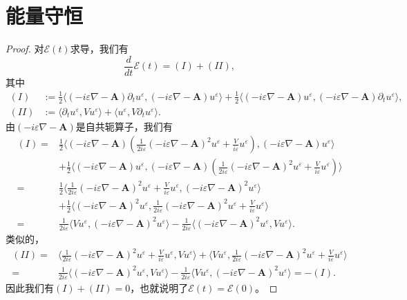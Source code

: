 \section{能量守恒}
\begin{proof}
对$\mathcal E(t)$求导，我们有 
\[
\frac{d}{dt}\mathcal E(t)=(I)+(II),
\]
其中
\begin{align*}
(I)&:=\frac{1}{2}\langle(-i\varepsilon\nabla-\mathbf{A})\partial_t u^{\varepsilon},(-i\varepsilon\nabla-\mathbf{A})u^{\varepsilon}\rangle+\frac{1}{2}\langle (-i\varepsilon\nabla-\mathbf{A})u^{\varepsilon},(-i\varepsilon\nabla-\mathbf{A})\partial_t u^{\varepsilon}\rangle, \\
(II)&:=\langle\partial_t u^{\varepsilon},Vu^{\varepsilon}\rangle+\langle u^{\varepsilon},V\partial_t u^{\varepsilon}\rangle.
\end{align*}
由$(-i\varepsilon\nabla-\mathbf{A})$是自共轭算子，我们有
\begin{align*}
(I)=&\frac{1}{2}\langle(-i\varepsilon\nabla-\mathbf{A})\left(\frac{1}{2i\varepsilon}(-i\varepsilon\nabla-\mathbf{A})^2 u^{\varepsilon}+\frac{V}{i\varepsilon}u^{\varepsilon}\right),(-i\varepsilon\nabla-\mathbf{A})u^{\varepsilon}\rangle\\
&+\frac{1}{2}\langle(-i\varepsilon\nabla-\mathbf{A})u^{\varepsilon},(-i\varepsilon\nabla-\mathbf{A})\left(\frac{1}{2i\varepsilon}(-i\varepsilon\nabla-\mathbf{A})^2 u^{\varepsilon}+\frac{V}{i\varepsilon}u^{\varepsilon}\right)\rangle\\
=&\frac{1}{2}\langle\frac{1}{2i\varepsilon}(-i\varepsilon\nabla-\mathbf{A})^2 u^{\varepsilon}+\frac{V}{i\varepsilon}u^{\varepsilon},(-i\varepsilon\nabla-\mathbf{A})^2u^{\varepsilon}\rangle\\
&+\frac{1}{2}\langle(-i\varepsilon\nabla-\mathbf{A})^2 u^{\varepsilon},\frac{1}{2i\varepsilon}(-i\varepsilon\nabla-\mathbf{A})^2 u^{\varepsilon}+\frac{V}{i\varepsilon}u^{\varepsilon}\rangle\\
=&\frac{1}{2i\varepsilon}\langle Vu^{\varepsilon},(-i\varepsilon\nabla-\mathbf{A})^2 u^{\varepsilon}\rangle-\frac{1}{2i\varepsilon}\langle(-i\varepsilon\nabla-\mathbf{A})^2 u^{\varepsilon},Vu^{\varepsilon}\rangle. 
\end{align*}
类似的，
\begin{align*}
(II)=&\langle \frac{1}{2i\varepsilon}(-i\varepsilon\nabla-\mathbf{A})^2 u^{\varepsilon}+\frac{V}{i\varepsilon}u^{\varepsilon},Vu^{\varepsilon}\rangle+\langle Vu^{\varepsilon},\frac{1}{2i\varepsilon}(-i\varepsilon\nabla-\mathbf{A})^2 u^{\varepsilon}
+\frac{V}{i\varepsilon}u^{\varepsilon}\rangle \\
=&\frac{1}{2i\varepsilon}\langle(-i\varepsilon\nabla-\mathbf{A})^2 u^{\varepsilon},Vu^{\varepsilon}\rangle-\frac{1}{2i\varepsilon}\langle Vu^{\varepsilon},(-i\varepsilon\nabla-\mathbf{A})^2 u^{\varepsilon}\rangle = -(I).
\end{align*}
因此我们有$(I)+(II)=0$，也就说明了$\mathcal E(t) = \mathcal E(0)$。
\end{proof}

